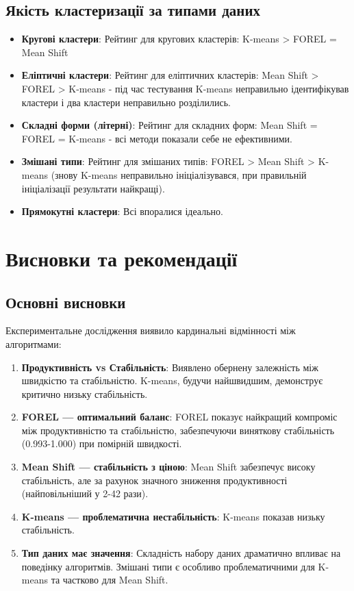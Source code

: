 \documentclass[12pt,a4paper]{article}
\begin{document}
\subsection{Якість кластеризації за типами даних}

\begin{itemize}
    \item \textbf{Кругові кластери}: Рейтинг для кругових кластерів: K-means > FOREL = Mean Shift
    \item \textbf{Еліптичні кластери}: Рейтинг для еліптичних кластерів: Mean Shift > FOREL > K-means - під час тестування K-means неправильно ідентифікував кластери і два кластери неправильно розділились.
    \item \textbf{Складні форми (літерні)}: Рейтинг для складних форм: Mean Shift = FOREL = K-means - всі методи показали себе не ефективними.
    \item \textbf{Змішані типи}: Рейтинг для змішаних типів: FOREL > Mean Shift > K-means (знову K-means неправильно ініціалізувався, при правильній ініціалізації результати найкращі).
    \item \textbf{Прямокутні кластери}: Всі впоралися ідеально.
\end{itemize}

\section{Висновки та рекомендації}

\subsection{Основні висновки}

Експериментальне дослідження виявило кардинальні відмінності між алгоритмами:

\begin{enumerate}
    \item \textbf{Продуктивність vs Стабільність}: Виявлено обернену залежність між швидкістю та стабільністю. K-means, будучи найшвидшим, демонструє критично низьку стабільність.

    \item \textbf{FOREL — оптимальний баланс}: FOREL показує найкращий компроміс між продуктивністю та стабільністю, забезпечуючи виняткову стабільність (0.993-1.000) при помірній швидкості.

    \item \textbf{Mean Shift — стабільність з ціною}: Mean Shift забезпечує високу стабільність, але за рахунок значного зниження продуктивності (найповільніший у 2-42 рази).

    \item \textbf{K-means — проблематична нестабільність}: K-means показав низьку стабільність.

    \item \textbf{Тип даних має значення}: Складність набору даних драматично впливає на поведінку алгоритмів. Змішані типи є особливо проблематичними для K-means та частково для Mean Shift.
\end{enumerate}
\end{document}
